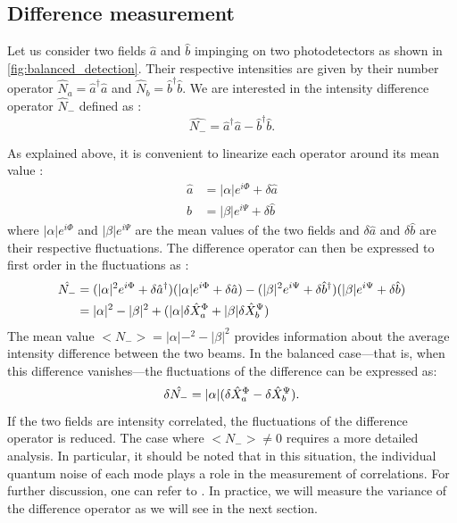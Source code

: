 \subsection{Difference measurement}
Let us consider two fields $\hat{a}$ and $\hat{b}$ impinging on two photodetectors as shown in \autoref{fig:balanced_detection}. Their respective intensities 
are given by their number operator $\hat{N}_a=\hat{a}^\dagger\hat{a}$ and $\hat{N}_b=\hat{b}^\dagger\hat{b}$.
We are interested in the intensity difference operator $\hat{N}_-$ defined as :
\begin{equation}
    \label{eq:diff_op}
    \hat{N_-} = \hat{a}^\dagger\hat{a} - \hat{b}^\dagger\hat{b}.
\end{equation}

As explained above, it is convenient to linearize each operator around its mean value :
\begin{equation}
    \begin{aligned}
    \hat{a} &= |\alpha|e^{i\Phi} + \delta \hat{a} \\
    \hat{b} &= |\beta|e^{i\Psi} + \delta \hat{b}
    \end{aligned}
\end{equation}
where $|\alpha|e^{i\Phi}$ and $|\beta|e^{i\Psi}$ are the mean values of the two fields and $\delta \hat{a}$ and $\delta \hat{b}$ are their respective fluctuations.
The difference operator can then be expressed to first order in the fluctuations as :
\begin{equation}
    \label{eq:diff_op2}
    \begin{aligned}
    \hat{N_-} &= (|\alpha|^2e^{i\Phi}+\delta \hat{a}^\dagger)(|\alpha|e^{i\Phi}+\delta \hat{a}) - (|\beta|^2e^{i\Psi}+\delta \hat{b}^\dagger)(|\beta|e^{i\Psi}+\delta \hat{b}) \\
    &= |\alpha|^2 - |\beta|^2 +(|\alpha|\delta \hat{X}_a^\Phi + |\beta|\delta \hat{X}_b^\Psi) 
    \end{aligned}
\end{equation}
The mean value $<N_->=|\alpha|-^2-|\beta|^2$ provides information about the average intensity difference between the two beams. In the balanced case—that is, when this difference vanishes—the fluctuations of the difference can be expressed as:
\begin{equation}
    \label{eq:diff_fluctuation}
    \delta \hat{N_-} = |\alpha|(\delta \hat{X}_a^\Phi - \delta \hat{X}_b^\Psi).
\end{equation}
If the two fields are intensity correlated, the fluctuations of the difference operator is reduced. The case where $<N_->\neq0$ requires a more detailed analysis. In particular, it should be noted that in this situation, the individual quantum noise of each mode plays a role in the measurement of correlations. For further discussion, one can refer to \cite{treps_fabre_criteria_2004}. 
In practice, we will measure the variance of the difference operator as we will see in the next section.
